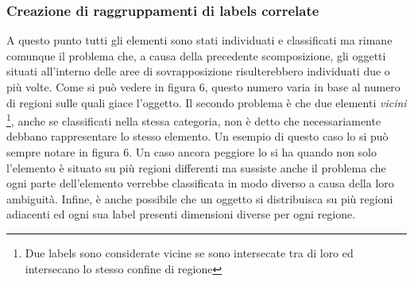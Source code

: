 \subsubsection{Creazione di raggruppamenti di labels correlate} 
A questo punto tutti gli elementi sono stati individuati e classificati ma rimane comunque il problema che, a causa della precedente scomposizione, gli oggetti situati all'interno delle aree di sovrapposizione risulterebbero individuati due o più volte. Come si può vedere in figura 6, questo numero varia in base al numero di regioni sulle quali giace l'oggetto. Il secondo problema è che due elementi \textit{vicini} \footnote{Due labels sono considerate vicine se sono intersecate tra di loro ed intersecano lo stesso confine di regione}, anche se classificati nella stessa categoria, non è detto che necessariamente debbano rappresentare lo stesso elemento. Un esempio di questo caso lo si può sempre notare in figura 6. Un caso ancora peggiore lo si ha quando non solo l'elemento è situato su più regioni differenti ma sussiste anche il problema che ogni parte dell'elemento verrebbe classificata in modo diverso a causa della loro ambiguità. Infine, è anche possibile che un oggetto si distribuisca su più regioni adiacenti ed ogni sua label presenti dimensioni diverse per ogni regione.
